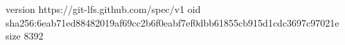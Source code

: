 version https://git-lfs.github.com/spec/v1
oid sha256:6eab71ed88482019af69cc2b6f0eabf7ef0dbb61855cb915d1cdc3697c97021e
size 8392
